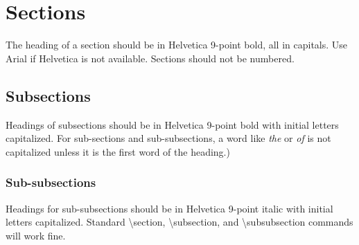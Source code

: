 \section{Sections}

The heading of a section should be in Helvetica 9-point bold, all in
                                capitals. Use Arial if Helvetica is not available. Sections should
                                not be numbered.

\subsection{Subsections}

Headings of subsections should be in Helvetica 9-point bold with
                                initial letters capitalized.  For
                                sub-sections and sub-subsections, a word like \emph{the} or \emph{of}
                                is not capitalized unless it is the first word of the heading.)

\subsubsection{Sub-subsections}

Headings for sub-subsections should be in Helvetica 9-point italic
                                with initial letters capitalized.  Standard {\textbackslash}section,
                                {\textbackslash}subsection, and {\textbackslash}subsubsection commands
                                will work fine.
